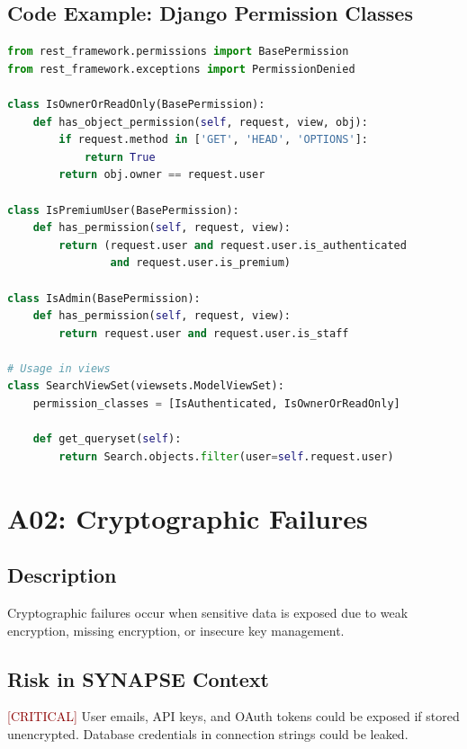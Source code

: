 \documentclass{report}
\begin{document}
\subsection{Code Example: Django Permission Classes}
\begin{lstlisting}[language=Python]
from rest_framework.permissions import BasePermission
from rest_framework.exceptions import PermissionDenied

class IsOwnerOrReadOnly(BasePermission):
    def has_object_permission(self, request, view, obj):
        if request.method in ['GET', 'HEAD', 'OPTIONS']:
            return True
        return obj.owner == request.user

class IsPremiumUser(BasePermission):
    def has_permission(self, request, view):
        return (request.user and request.user.is_authenticated 
                and request.user.is_premium)

class IsAdmin(BasePermission):
    def has_permission(self, request, view):
        return request.user and request.user.is_staff

# Usage in views
class SearchViewSet(viewsets.ModelViewSet):
    permission_classes = [IsAuthenticated, IsOwnerOrReadOnly]
    
    def get_queryset(self):
        return Search.objects.filter(user=self.request.user)
\end{lstlisting}

\section{A02: Cryptographic Failures}

\subsection{Description}
Cryptographic failures occur when sensitive data is exposed due to weak encryption, missing encryption, or insecure key management.

\subsection{Risk in SYNAPSE Context}
\textcolor{darkred}{[CRITICAL]} User emails, API keys, and OAuth tokens could be exposed if stored unencrypted. Database credentials in connection strings could be leaked.
\end{document}
